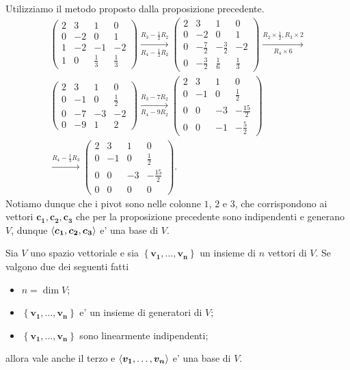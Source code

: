 \begin{solution}
    Utilizziamo il metodo proposto dalla proposizione precedente. 
    \begin{gather*}
        \begin{pmatrix}
            2&3&1&0\\0&-2&0&1\\1&-2&-1&-2\\1&0&\frac{1}{3}&\frac13
        \end{pmatrix} \xrightarrow[R_4 - \frac{1}{2}R_2]{R_3 - \frac{1}{2}R_2}
        \begin{pmatrix}
            2&3&1&0\\0&-2&0&1\\0&-\frac72&-\frac32&-2\\0&-\frac{3}{2}&\frac{1}{6}&\frac13
        \end{pmatrix} \xrightarrow[R_4 \times 6]{R_2\times \frac12, R_3\times 2} \\
        \begin{pmatrix}
            2&3&1&0\\0&-1&0&\frac12\\0&-7&-3&-2\\0&-9&1&2
        \end{pmatrix} \xrightarrow[R_4-9R_2]{R_3 -7R_2} 
        \begin{pmatrix}
            2&3&1&0\\0&-1&0&\frac12\\0&0&-3&-\frac{15}{2}\\0&0&-1&-\frac{5}{2}
        \end{pmatrix}\\ \xrightarrow[]{R_4 -\frac13R_3} 
        \begin{pmatrix}
            2&3&1&0\\0&-1&0&\frac12\\0&0&-3&-\frac{15}{2}\\0&0&0&0
        \end{pmatrix}.
    \end{gather*}
    Notiamo dunque che i pivot sono nelle colonne $1$, $2$ e $3$, che corrispondono ai vettori $\bm{c_1}, \bm{c_2}, \bm{c_3}$ che per la proposizione precedente sono indipendenti e generano $V$, dunque $\left\langle \bm{c_1}, \bm{c_2}, \bm{c_3} \right\rangle$ e' una base di $V$.
\end{solution}

\begin{proposition}\label{base=dim_gener_indip}
    Sia $V$ uno spazio vettoriale e sia $\left\{\bm{v_1}, \dots, \bm{v_n} \right\}$ un insieme di $n$ vettori di $V$. Se valgono due dei seguenti fatti
    \begin{itemize}
        \item $n = \dim V$;
        \item $\left\{\bm{v_1}, \dots, \bm{v_n} \right\}$ e' un insieme di generatori di $V$;
        \item $\left\{\bm{v_1}, \dots, \bm{v_n} \right\}$ sono linearmente indipendenti;
    \end{itemize}
    allora vale anche il terzo e $\left\langle \bm{v_1}, \dots, \bm{v_n} \right\rangle$ e' una base di $V$.
\end{proposition}

